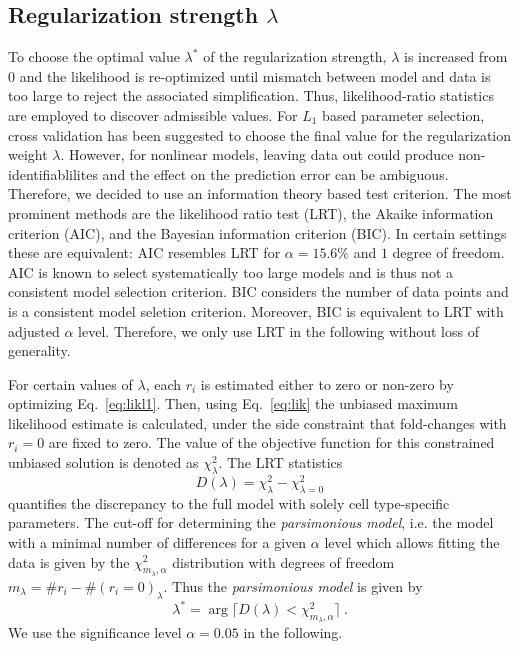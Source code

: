 \documentclass{bioinfo}
\begin{document}
\subsection{Regularization strength $\lambda$}
To choose the optimal value $\lambda^*$ of the regularization strength, $\lambda$ is increased from 0 and the likelihood is re-optimized until mismatch between model and data is too large to reject the associated simplification.
Thus, likelihood-ratio statistics are employed to discover admissible values.
For $L_1$ based parameter selection, cross validation has been suggested to choose the final value for the regularization weight $\lambda$.
However, for nonlinear models, leaving data out could produce non-identifiablilites and the effect on the prediction error can be ambiguous.
Therefore, we decided to use an information theory based test criterion.
The most prominent methods are the likelihood ratio test (LRT), the Akaike information criterion (AIC), and the Bayesian information criterion (BIC).
In certain settings these are equivalent: AIC resembles LRT for $\alpha = 15.6\%$ and $1$ degree of freedom.
AIC is known to select systematically too large models and is thus not a consistent model selection criterion.
BIC considers the number of data points and is a consistent model seletion criterion.
Moreover, BIC is equivalent to LRT with adjusted $\alpha$ level.
Therefore, we only use LRT in the following without loss of generality.

For certain values of $\lambda$, each $r_i$ is estimated either to zero or non-zero by optimizing Eq.~\ref{eq:likl1}.
Then, using Eq.~\ref{eq:lik} the unbiased maximum likelihood estimate is calculated, under the side constraint that fold-changes with $r_i=0$ are fixed to zero.
The value of the objective function for this constrained unbiased solution is denoted as $\chi^2_\lambda$.
The LRT statistics
\begin{equation}
	D(\lambda) = \chi^2_\lambda - \chi^2_{\lambda=0}
\end{equation}
quantifies the discrepancy to the full model with solely cell type-specific parameters.
The cut-off for determining the \emph{parsimonious model}, i.e. the model with a minimal number of differences for a given $\alpha$ level which allows fitting the data is given by the $\chi^2_{m_\lambda,\alpha}$ distribution with degrees of freedom $m_\lambda=\#r_i - \#(r_i=0)_\lambda$.
Thus the \emph{parsimonious model} is given by
\begin{equation}
	\lambda^* = \arg \lceil D(\lambda) < \chi^2_{m_\lambda,\alpha} \rceil \:.
\end{equation}
We use the significance level $\alpha = 0.05$ in the following.
\end{document}
